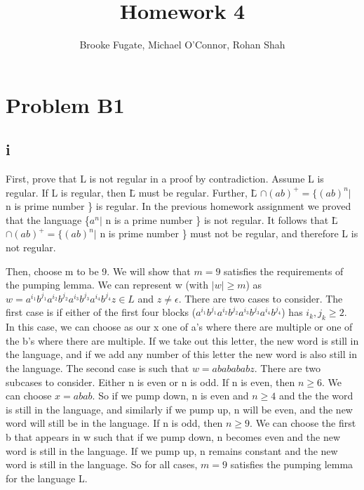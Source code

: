 \documentclass[12pt]{article}
\begin{document}
\pagestyle{plain}
\titleformat{\subsection}[runin]
  {\normalfont\large\bfseries}{\thesubsection}{1em}{}

\title{Homework 4}
\author{Brooke Fugate, Michael O'Connor, Rohan Shah}
\date{}

\maketitle

\section*{Problem B1}
\subsection*{i}
First, prove that L is not regular in a proof by contradiction. Assume L is regular. 
If L is regular, then \={L} must be regular. Further, \={L} $\cap (ab)^+ = \{(ab)^n |$ n is prime number \}
is regular. In the previous homework assignment we proved that the language \{$a^n |$ n is a prime number \}
is not regular. It follows that \={L} $\cap (ab)^+ = \{(ab)^n |$ n is prime number \} must not be regular, 
and therefore L is not regular.

\medskip

Then, choose m to be 9. We will show that $m=9$ satisfies the requirements of the pumping lemma.
We can represent w (with $|w| \ge m$) as $w=a^{i_1}b^{j_1}a^{i_2}b^{j_2}a^{i_3}b^{j_3}a^{i_4}b^{j_4}z \in L$
and $z \neq \epsilon$. 
There are two cases to consider. The first case is if either of the first four blocks 
($a^{i_1}b^{j_1}a^{i_2}b^{j_2}a^{i_3}b^{j_3}a^{i_4}b^{j_4}$) has $i_k,j_k \ge 2$. In this case,
we can choose as our x one of a's where there are multiple or one of the b's where there are multiple.
If we take out this letter, the new word is still in the language, and if we add any number of this letter
the new word is also 
still in the language. The second case is such that $w=ababababz$. There are two subcases to 
consider. Either n is even or n is odd. If n is even, then $n \ge 6$. We can choose $x=abab$. 
So if we pump down, n is even and $n \ge 4$ and the the word is still in the language, 
and similarly if we pump up, n will be even, and the new word will still be in the language.
If n is odd, then $n \ge 9$. We can choose the first b that appears in w such that if we pump down,
n becomes even and the new word is still in the language. If we pump up, n remains constant 
and the new word is still in the language. So for all cases, $m=9$ satisfies the pumping lemma
for the language L.
\end{document}
